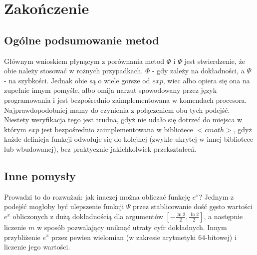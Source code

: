 \documentclass[11pt,wide]{mwart}
\begin{document}
\section{Zakończenie}
\subsection{Ogólne podsumowanie metod}
Głównym wnioskiem płynącym z porównania metod $\Phi$ i $\Psi$ jest stwierdzenie, że obie należy stosować w rożnych przypadkach. $\Phi$ - gdy zależy na dokładności, a $\Psi$ - na szybkości. Jednak obie są o wiele gorsze od $exp$, wiec albo opiera się ona na zupełnie innym pomyśle, albo omija narzut spowodowany przez język programowania i jest bezpośrednio zaimplementowana w komendach procesora. Najprawdopodobniej mamy do czynienia z połączeniem obu tych podejść. Niestety weryfikacja tego jest trudna, gdyż nie udało się dotrzeć do miejsca w którym $exp$ jest bezpośrednio zaimplementowana w bibliotece $<cmath>$, gdyż każde definicja funkcji odwołuje się do kolejnej (zwykle ukrytej w innej bibliotece lub wbudowanej), bez praktycznie jakichkolwiek przekształceń.
\subsection{Inne pomysły}
Prowadzi to do rozważań: jak inaczej można obliczać funkcję $e^x$? Jednym z podejść mogłoby być ulepszenie funkcji $\Psi$ przez stablicowanie dość gęsto wartości $e^x$ obliczonych z dużą dokładnością dla argumentów $[-\frac{\ln 2}{2}, \frac{\ln 2}{2}]$, a następnie liczenie $m$ w sposób pozwalający uniknąć utraty cyfr dokładnych. Innym przybliżenie $e^x$ przez pewien wielomian (w zakresie arytmetyki 64-bitowej) i liczenie jego wartości.
\newpage
\thispagestyle{empty}
\appendix
\end{document}
